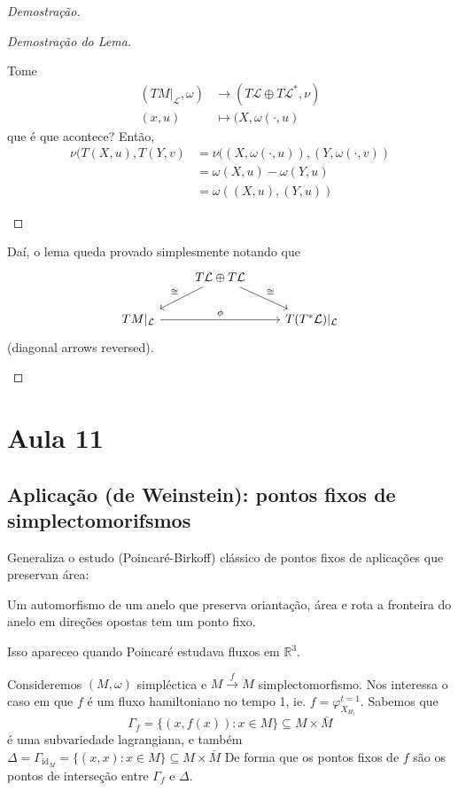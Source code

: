 \begin{proof}[Demostra\c c\~ao]
\begin{lemma}
\begin{enumerate}
\begin{proof}[Demostra\c c\~ao do Lema]
\begin{enumerate}[label=\textbf{Step \arabic*}]
Tome 
\begin{align*}
	(TM|_{\mathcal{L}},\omega)  &\longrightarrow (T\mathcal{L}\oplus T\mathcal{L}^*,\nu) \\
	(x,u) &\longmapsto (X,\omega(\cdot ,u)
\end{align*}
que \'e que acontece? Ent\~ao,
\begin{align*}
	\nu(T(X,u),T(Y,v)&=\nu((X,\omega(\cdot ,u)),(Y,\omega(\cdot ,v))\\
	&=\omega(X,u)-\omega(Y,u)\\
	&=\omega((X,u),(Y,u))
\end{align*}
				\end{enumerate}
			\end{proof}
	\end{enumerate}
	Da\'i, o lema queda provado simplesmente notando que
	\[\begin{tikzcd}
	&T\mathcal{L}\oplus T\mathcal{L}\arrow[dl,"\cong ",swap]\arrow[dr,"\cong "]\\
	TM|_{\mathcal{L}}\arrow[rr,"\phi"]&&T(T^*\mathcal{L})|_{\mathcal{L}}
	\end{tikzcd}\]
	(diagonal arrows reversed).
\end{lemma}
\end{proof}



\section{Aula 11}

\subsection{Aplica\c c\~ao (de Weinstein): pontos fixos de simplectomorifsmos}

Generaliza o estudo (Poincar\'e-Birkoff) cl\'assico de pontos fixos de aplica\c c\~oes que preservan \'area:

\begin{thm}\leavevmode
	Um automorfismo de um anelo que preserva orianta\c c\~ao, \'area e rota a fronteira do anelo em dire\c c\~oes opostas tem um ponto fixo.
\end{thm}

Isso apareceo quando Poincar\'e estudava fluxos em $\mathbb{R}^{3}$.

Consideremos $(M,\omega)$ simpl\'ectica e $M \overset{f}{\longrightarrow}M$ simplectomorfismo. Nos interessa o caso em que $f$ \'e um fluxo hamiltoniano no tempo 1, ie. $f=\varphi^{t=1}_{X_{H_t}}$. Sabemos que
\[\Gamma_f=\{(x,f(x)):x\in M\} \subseteq M\times \bar{M} \]
\'e uma subvariedade lagrangiana, e tamb\'em
$\Delta =\Gamma_{\operatorname{id}_M}=\{(x,x):x\in M\} \subseteq M\times \bar{M}$ 
De forma que os pontos fixos de $f$ s\~ao os pontos de interse\c c\~ao entre $\Gamma_f$ e $\Delta$.

